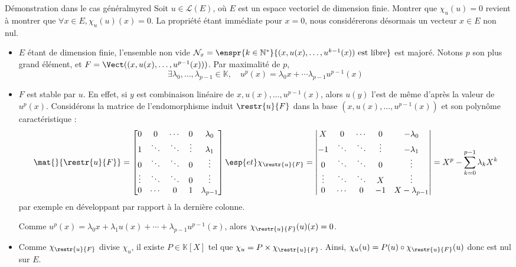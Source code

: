     \begin{demo}{Démonstration dans le cas général}{myred}
        Soit $u \in \mathcal{L}(E)$, où $E$ est un espace vectoriel de dimension finie. Montrer que $\chi_u(u) = 0$ revient à montrer que $\forall x \in E, \chi_u(u)(x) = 0$. La propriété étant immédiate pour $x = 0$, nous considérerons désormais un vecteur $x \in E$ non nul.
        \begin{itemize}
            \item $E$ étant de dimension finie, l’ensemble non vide $\mathcal{N}_x = \enspr{k \in \mathbb{N}^*}{(x,u(x), \ldots, u^{k-1}(x)) \text{ est libre}}$ est majoré. Notons $p$ son plus grand élément, et $F = \Vect((x,u(x), \ldots, u^{p-1}(x)))$. Par maximalité de $p$, 
            \[ \exists \lambda_0,\ldots, \lambda_{p-1} \in \mathbb{K}, \quad u^p(x) = \lambda_0 x + \cdots \lambda_{p-1} u^{p-1}(x) \]   
            \item $F$ est stable par $u$. En effet, si $y$ est combinaison linéaire de $x,u(x), \ldots, u^{p-1}(x)$, alors $u(y)$ l’est de même d’après la valeur de $u^p(x)$. Considérons la matrice de l’endomorphisme induit $\restr{u}{F}$ dans la base $(x, u(x), \ldots, u^{p-1}(x))$ et son polynôme caractéristique :
            \[ \mat{}{\restr{u}{F}} = \begin{bmatrix}
                0 & 0 & \cdots & 0 & \lambda_0 \\
                1 & \ddots & \ddots & \vdots & \lambda_1 \\
                0 & \ddots & \ddots & 0 & \vdots \\
                \vdots & \ddots & \ddots & 0 & \vdots \\
                0 & \cdots & 0 & 1 & \lambda_{p-1}
            \end{bmatrix} \esp{et} \chi_{\restr{u}{F}} = \begin{vmatrix}
                X & 0 & \cdots & 0 & -\lambda_0 \\
                - 1 & \ddots & \ddots & \vdots & -\lambda_1 \\
                0 & \ddots & \ddots & 0 & \vdots \\
                \vdots & \ddots & \ddots & X & \vdots \\
                0 & \cdots & 0 & - 1 & X - \lambda_{p-1}
            \end{vmatrix} = X^p - \sum_{k=0}^{p-1} \lambda_k X^k \]   
            par exemple en développant par rapport à la dernière colonne.
            
            Comme $u^p(x) = \lambda_0 x + \lambda_1 u(x) + \cdots + \lambda_{p-1} u^{p-1}(x)$, alors $\chi_{\restr{u}{F}}(u)(x) = 0$.
            \item Comme $\chi_{\restr{u}{F}}$ divise $\chi_u$, il existe $P \in \mathbb{K}[X]$ tel que $\chi_{u} = P \times \chi_{\restr{u}{F}}$. Ainsi, $\chi_u(u) = P(u) \circ \chi_{\restr{u}{F}}(u)$ donc est nul sur $E$.
        \end{itemize}
    \end{demo}


